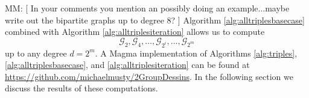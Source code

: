 \documentclass{dcthesis}
\newcommand{\mm}[1]{{\color{blue} \sf MM: [#1]}}
\numberwithin{equation}{section}
\theoremstyle{definition}
\theoremstyle{remark}
\begin{document}
{{      %
    \mm{
      In your comments you mention an possibly doing
      an example...maybe write out the bipartite
      graphs up to degree 8?
    }
    Algorithm
    \ref{alg:alltriplesbasecase}
    combined with
    Algorithm
    \ref{alg:alltriplesiteration}
    allows us to compute
    \begin{equation}
      \label{eqn:sequenceofgraphs}
      \mathscr{G}_2,
      \mathscr{G}_4,
      \dots,
      \mathscr{G}_{2^i},
      \dots,
      \mathscr{G}_{2^m}
    \end{equation}
    up to any degree $d=2^m$.
    A \textsf{Magma} implementation of
    Algorithms
    \ref{alg:triples},
    \ref{alg:alltriplesbasecase},
    and
    \ref{alg:alltriplesiteration}
    can be found at
    \url{https://github.com/michaelmusty/2GroupDessins}.
    In the following section we discuss
    the results of these computations.
  }
}
\end{document}
